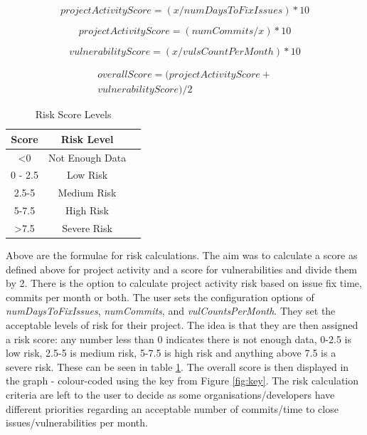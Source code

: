 \documentclass[conference]{IEEEtran}
\begin{document}
\[ projectActivityScore = ( x / numDaysToFixIssues ) * 10\]

\[ projectActivityScore = ( numCommits / x ) * 10\]

\[vulnerabilityScore = ( x / vulsCountPerMonth ) * 10\]

\begin{multline*}
  overallScore = ( projectActivityScore +\\ vulnerabilityScore) / 2 
\end{multline*}

\begin{table}
 \caption{Risk Score Levels}
\label{risklevels}
\begin{center}
\begin{tabular}{|c|c|c|}
\hline
    \textbf{Score} & \textbf{Risk Level} \\ \hline
    \textless  0 & Not Enough Data \\ \hline
    0 - 2.5 & Low Risk \\ \hline
    2.5-5 & Medium Risk \\ \hline
    5-7.5 & High Risk \\ \hline
    \textgreater 7.5  & Severe Risk \\ \hline
\end{tabular}
\end{center}
\end{table}

Above are the formulae for risk calculations. The aim was to calculate a score as defined above for project activity and a score for vulnerabilities and divide them by 2. There is the option to calculate project activity risk based on issue fix time, commits per month or both. The user sets the configuration options of \textit{numDaysToFixIssues}, \textit{numCommits}, and \textit{vulCountsPerMonth}. They set the acceptable levels of risk for their project. The idea is that they are then assigned a risk score: any number less than 0 indicates there is not enough data, 0-2.5 is low risk, 2.5-5 is medium risk, 5-7.5 is high risk and anything above 7.5 is a severe risk. These can be seen in table \ref{risklevels}. The overall score is then displayed in the graph - colour-coded using the key from Figure \ref{fig:key}. The risk calculation criteria are left to the user to decide as some organisations/developers have different priorities regarding an acceptable number of commits/time to close issues/vulnerabilities per month. 
\end{document}
